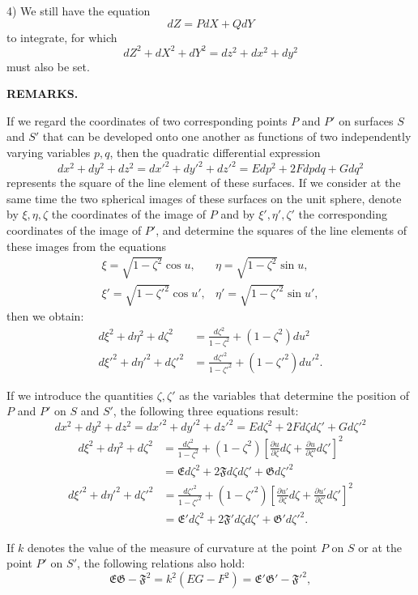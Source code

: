 \par
4) We still have the equation
\[
dZ=PdX+QdY
\]
\noindent to integrate, for which
\[
dZ^2+dX^2+dY^2=dz^2+dx^2+dy^2
\]
\noindent must also be set.

\begin{center}\textbf{REMARKS.}\end{center}
\noindent\hspace*{1.2em}If we regard the coordinates of two corresponding points $P$ and $P'$ on surfaces $S$ and $S'$ that can be developed onto one another as functions of two independently varying variables $p,q$, then the quadratic differential expression
\[
dx^2+dy^2+dz^2=dx'^2+dy'^2+dz'^2=Edp^2+2Fdpdq+Gdq^2
\]
\noindent represents the square of the line element of these surfaces. If we consider at the same time the two spherical images of these surfaces on the unit sphere, denote by $\xi,\eta,\zeta$ the coordinates of the image of $P$ and by $\xi',\eta',\zeta'$ the corresponding coordinates of the image of $P'$, and determine the squares of the line elements of these images from the equations
\[
\begin{array}{ll}
\xi=\sqrt{1-\zeta^2}\cos u,&\eta=\sqrt{1-\zeta^2}\sin u,\\[4pt]
\xi'=\sqrt{1-\zeta'^2}\cos u',&\eta'=\sqrt{1-\zeta'^2}\sin u',
\end{array}
\]
\noindent then we obtain:
\[
\begin{aligned}
d\xi^2+d\eta^2+d\zeta^2&=\frac{d\zeta^2}{1-\zeta^2}+(1-\zeta^2)du^2\\[5pt]
d\xi'^2+d\eta'^2+d\zeta'^2&=\frac{d\zeta'^2}{1-\zeta'^2}+(1-\zeta'^2)du'^2.
\end{aligned}
\]

\noindent If we introduce the quantities $\zeta,\zeta'$ as the variables that determine the position of $P$ and $P'$ on $S$ and $S'$, the following three equations result:
\[
dx^2+dy^2+dz^2=dx'^2+dy'^2+dz'^2=Ed\zeta^2+2Fd\zeta d\zeta'+Gd\zeta'^2
\]
\[
\begin{aligned}
d\xi^2+d\eta^2+d\zeta^2
&=\frac{d\zeta^2}{1-\zeta^2}+(1-\zeta^2)\left[\frac{\partial u}{\partial\zeta}d\zeta+\frac{\partial u}{\partial\zeta'}d\zeta'\right]^2\\
&=\mathfrak{E}d\zeta^2+2\mathfrak{F}d\zeta d\zeta'+\mathfrak{G}d\zeta'^2
\end{aligned}
\]
\[
\begin{aligned}
d\xi'^2+d\eta'^2+d\zeta'^2
&=\frac{d\zeta'^2}{1-\zeta'^2}+(1-\zeta'^2)\left[\frac{\partial u'}{\partial\zeta}d\zeta+\frac{\partial u'}{\partial\zeta'}d\zeta'\right]^2\\
&=\mathfrak{E}'d\zeta^2+2\mathfrak{F}'d\zeta d\zeta'+\mathfrak{G}'d\zeta'^2.
\end{aligned}
\]

\noindent If $k$ denotes the value of the measure of curvature at the point $P$ on $S$ or at the point $P'$ on $S'$, the following relations also hold:
\[
\mathfrak{E}\mathfrak{G}-\mathfrak{F}^2=k^2(EG-F^2)=\mathfrak{E}'\mathfrak{G}'-\mathfrak{F}'^2,
\]

